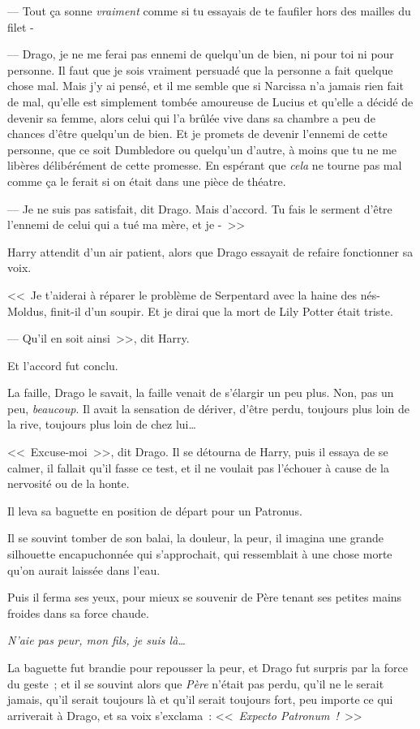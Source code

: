 --- Tout ça sonne \emph{vraiment} comme si tu essayais de te faufiler hors des mailles du filet -

--- Drago, je ne me ferai pas ennemi de quelqu'un de bien, ni pour toi ni pour personne. Il faut que je sois vraiment persuadé que la personne a fait quelque chose mal. Mais j'y ai pensé, et il me semble que si Narcissa n'a jamais rien fait de mal, qu'elle est simplement tombée amoureuse de Lucius et qu'elle a décidé de devenir sa femme, alors celui qui l'a brûlée vive dans sa chambre a peu de chances d'être quelqu'un de bien. Et je promets de devenir l'ennemi de cette personne, que ce soit Dumbledore ou quelqu'un d'autre, à moins que tu ne me libères délibérément de cette promesse. En espérant que \emph{cela} ne tourne pas mal comme ça le ferait si on était dans une pièce de théatre.

--- Je ne suis pas satisfait, dit Drago. Mais d'accord. Tu fais le serment d'être l'ennemi de celui qui a tué ma mère, et je -~>>

Harry attendit d'un air patient, alors que Drago essayait de refaire fonctionner sa voix.

<<~Je t'aiderai à réparer le problème de Serpentard avec la haine des nés-Moldus, finit-il d'un soupir. Et je dirai que la mort de Lily Potter était triste.

--- Qu'il en soit ainsi~>>, dit Harry.

Et l'accord fut conclu.

La faille, Drago le savait, la faille venait de s'élargir un peu plus. Non, pas un peu, \emph{beaucoup}. Il avait la sensation de dériver, d'être perdu, toujours plus loin de la rive, toujours plus loin de chez lui…

<<~Excuse-moi~>>, dit Drago. Il se détourna de Harry, puis il essaya de se calmer, il fallait qu'il fasse ce test, et il ne voulait pas l'échouer à cause de la nervosité ou de la honte.

Il leva sa baguette en position de départ pour un Patronus.

Il se souvint tomber de son balai, la douleur, la peur, il imagina une grande silhouette encapuchonnée qui s'approchait, qui ressemblait à une chose morte qu'on aurait laissée dans l'eau.

Puis il ferma ses yeux, pour mieux se souvenir de Père tenant ses petites mains froides dans sa force chaude.

\emph{N'aie pas peur, mon fils, je suis là…}

La baguette fut brandie pour repousser la peur, et Drago fut surpris par la force du geste~; et il se souvint alors que \emph{Père} n'était pas perdu, qu'il ne le serait jamais, qu'il serait toujours là et qu'il serait toujours fort, peu importe ce qui arriverait à Drago, et sa voix s'exclama~: <<~\emph{Expecto Patronum~!}~>>


